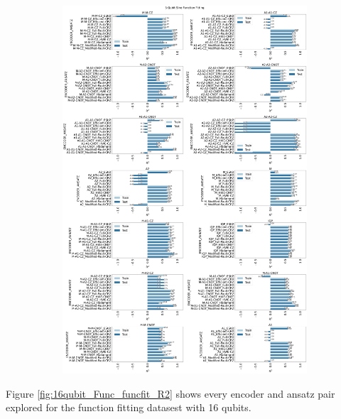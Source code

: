 \documentclass[journal=jacsat,manuscript=article]{achemso}
\begin{document}
\begin{figure}[H]
\begin{subfigure}[b]{\textwidth}
		\includegraphics[width=\textwidth]{images/Function_Fitting/5qubit_Sine_funcfit_R2.png}
		\caption{}
		\label{fig:5qubit_Sine_funcfit_R2}
	\end{subfigure}
	\caption{}
	\label{fig:5qubit_Func_funcfit_R2}
\end{figure}


Figure \ref{fig:16qubit_Func_funcfit_R2} shows every encoder and ansatz pair explored for the function fitting datasest with 16 qubits.
\end{document}
